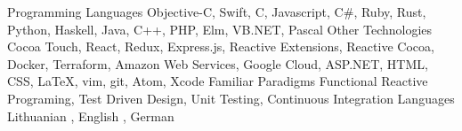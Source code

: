

\begin{cvskills}

  \medskip
  \cvskill
    {Programming Languages} %
    {Objective-C, Swift, C, Javascript, C\#, Ruby, Rust, Python, Haskell, Java, C++, PHP, Elm, VB.NET, Pascal} %
  \medskip
  \cvskill
    {Other Technologies} %
    {Cocoa Touch, React, Redux, Express.js, Reactive Extensions, Reactive Cocoa, Docker, Terraform, Amazon Web Services, Google Cloud, ASP.NET, HTML, CSS, LaTeX, vim, git, Atom, Xcode} %
  \medskip
  \cvskill
    {Familiar Paradigms} %
    {Functional Reactive Programing, Test Driven Design, Unit Testing, Continuous Integration} %
  \medskip
  \cvskill
    {Languages} %
    {Lithuanian \textit{\color{gray}{(native)}}, English \textit{\color{gray}{(fluent)}}, German \textit{\color{gray}{(basic)}}} %
\end{cvskills}
